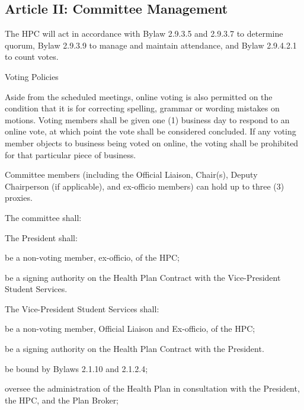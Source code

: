 \subsection{Article II: Committee Management}
\begin{longenum}[ label*=\thesubsection.\arabic*., align=left] 
\item The HPC will act in accordance with Bylaw 2.9.3.5 and 2.9.3.7 to determine quorum, Bylaw 2.9.3.9 to manage and maintain attendance, and Bylaw 2.9.4.2.1 to count votes.
\item Voting Policies
	\begin{longenum}[label*=\arabic*., align=left]	
	\item Aside from the scheduled meetings, online voting is also permitted on the condition that it is for correcting spelling, grammar or wording mistakes on motions. Voting members shall be given one (1) business day to respond to an online vote, at which point the vote shall be considered concluded. If any voting member objects to business being voted on online, the voting shall be prohibited for that particular piece of business.
	\item Committee members (including the Official Liaison, Chair(s), Deputy Chairperson (if applicable), and ex-officio members) can hold up to three (3) proxies.
	\end{longenum}
\item The committee shall:
	\begin{longenum}[label*=\arabic*., align=left]	
	\item The President shall:
		\begin{longenum}[label*=\arabic*., align=left]	
		\item be a non-voting member, ex-officio, of the HPC;
		\item be a signing authority on the Health Plan Contract with the Vice-President Student Services.
		\end{longenum}
	\item The Vice-President Student Services shall: 
		\begin{longenum}[label*=\arabic*., align=left]	
		\item be a non-voting member, Official Liaison and Ex-officio, of the HPC;
		\item be a signing authority on the Health Plan Contract with the President.
		\item be bound by Bylaws 2.1.10 and 2.1.2.4;
		\item oversee the administration of the Health Plan in consultation with the President, the HPC, and the Plan Broker;

\end{longenum}
\end{longenum}
\end{longenum}
